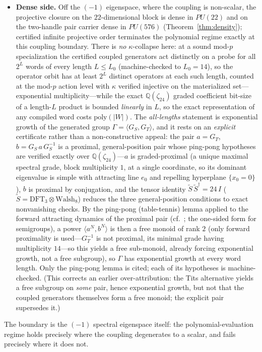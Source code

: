 \begin{theorem}
\begin{itemize}
\item \textbf{Dense side.} Off the $(-1)$ eigenspace, where the coupling is non-scalar, the projective closure on the $22$-dimensional block is dense in $PU(22)$ and on the two-handle pair carrier dense in $PU(576)$ (Theorem~\ref{thm:density}); certified infinite projective order terminates the polynomial regime exactly at this coupling boundary. There is \emph{no} $\kappa$-collapse here: at a sound mod-$p$ specialization the certified coupled generators act distinctly on a probe for all $2^{L}$ words of every length $L\le L_0$ (machine-checked to $L_0=14$), so the operator orbit has at least $2^{L}$ distinct operators at each such length, counted at the mod-$p$ action level with $\kappa$ verified injective on the materialized set---exponential multiplicity---while the exact $\mathbb{Q}(\zeta_{24})$ graded coefficient bit-size of a length-$L$ product is bounded \emph{linearly} in $L$, so the exact representation of any compiled word costs $\mathrm{poly}(|W|)$. The \emph{all-lengths} statement is exponential growth of the generated group $\Gamma=\langle G_S, G_T\rangle$, and it rests on an \emph{explicit} certificate rather than a non-constructive appeal: the pair $a=G_T$, $b=G_S\,a\,G_S^{-1}$ is a proximal, general-position pair whose ping-pong hypotheses are verified exactly over $\mathbb{Q}(\zeta_{24})$---$a$ is graded-proximal (a unique maximal spectral grade, block multiplicity $1$, at a single coordinate, so its dominant eigenvalue is simple with attracting line $e_0$ and repelling hyperplane $\{x_0=0\}$), $b$ is proximal by conjugation, and the tensor identity $\tilde S\,\tilde S^{\dagger}=24\,I$ ($\tilde S=\mathrm{DFT}_3\otimes\mathrm{Walsh}_8$) reduces the three general-position conditions to exact nonvanishing checks. By the ping-pong (table-tennis) lemma applied to the forward attracting dynamics of the proximal pair (cf.~\cite{delaharpe2000}; the one-sided form for semigroups), a power $\langle a^N, b^N\rangle$ is then a free monoid of rank $2$ (only forward proximality is used---$G_T^{-1}$ is not proximal, its minimal grade having multiplicity $14$---so this yields a free sub-monoid, already forcing exponential growth, not a free subgroup), so $\Gamma$ has exponential growth at every word length. Only the ping-pong lemma is cited; each of its hypotheses is machine-checked. (This corrects an earlier over-attribution: the Tits alternative yields a free subgroup on \emph{some} pair, hence exponential growth, but not that the coupled generators themselves form a free monoid; the explicit pair supersedes it.)
\end{itemize}
The boundary is the $(-1)$ spectral eigenspace itself: the polynomial-evaluation regime holds precisely where the coupling degenerates to a scalar, and fails precisely where it does not.
\end{theorem}

